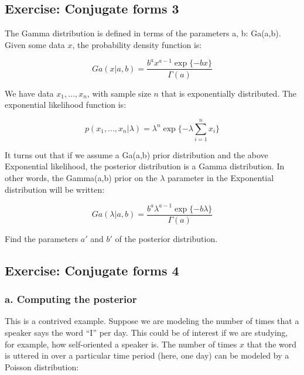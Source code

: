 \documentclass[12pt,]{krantz}
\theoremstyle{definition}
\theoremstyle{definition}
\theoremstyle{definition}
\theoremstyle{remark}
\begin{document}
\hypertarget{exercise-conjugate-forms-3}{%
\subsection{Exercise: Conjugate forms 3}\label{exercise-conjugate-forms-3}}

The Gamma distribution is defined in terms of the parameters a, b: Ga(a,b). Given some data \(x\), the probability density function is:

\begin{equation}
Ga(x | a,b)=\frac{b^a x^{a-1} \exp\{-bx\}}{\Gamma(a)}
\end{equation}

We have data \(x_1,\dots, x_n\), with sample size \(n\) that is exponentially distributed. The exponential likelihood function is:

\begin{equation}
p(x_1,\dots,x_n | \lambda)=\lambda^n \exp \{-\lambda \sum_{i=1}^n x_i \}
\end{equation}

It turns out that if we assume a Ga(a,b) prior distribution and the above Exponential likelihood, the posterior distribution is a Gamma distribution. In other words, the Gamma(a,b) prior on the \(\lambda\) parameter in the Exponential distribution will be written:

\begin{equation}
Ga(\lambda | a,b)=\frac{b^a \lambda^{a-1} \exp\{-b\lambda\}}{\Gamma(a)}
\end{equation}

Find the parameters \(a'\) and \(b'\) of the posterior distribution.

\hypertarget{exercise-conjugate-forms-4}{%
\subsection{Exercise: Conjugate forms 4}\label{exercise-conjugate-forms-4}}

\hypertarget{a.-computing-the-posterior}{%
\subsubsection{a. Computing the posterior}\label{a.-computing-the-posterior}}

This is a contrived example. Suppose we are modeling the number of times that a speaker says the word ``I'' per day. This could be of interest if we are studying, for example, how self-oriented a speaker is. The number of times \(x\) that the word is uttered in over a particular time period (here, one day) can be modeled by a Poisson distribution:
\end{document}
